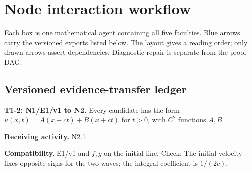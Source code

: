 \documentclass[preprint,12pt,aps,pra,showkeys,amsmath,amssymb,superscriptaddress,floatfix]{revtex4-2}
\theoremstyle{definition}
\theoremstyle{remark}
\newcommand{\field}[2]{\par\smallskip\noindent\textbf{#1.} #2\par}
\begin{document}
\clearpage\section{Node interaction workflow}

\begin{center}\end{center}

Each box is one mathematical agent containing all five faculties. Blue
arrows carry the versioned exports listed below. The layout gives a
reading order; only drawn arrows assert dependencies. Diagnostic repair
is separate from the proof DAG.

\subsection{Versioned evidence-transfer ledger}

\begingroup\small\linespread{1.05}\selectfont

\field{T1-2: N1/E1/v1 to N2}{Every candidate has the form \(u(x,t)=A(x-ct)+B(x+ct)\) for \(t>0\),
with \(C^2\) functions \(A,B\).}

\field{Receiving activity}{N2.1}

\field{Compatibility}{E1/v1 and \(f,g\) on the initial line. Check: The initial velocity fixes
opposite signs for the two waves; the integral coefficient is
\(1/(2c)\).}
\end{document}
